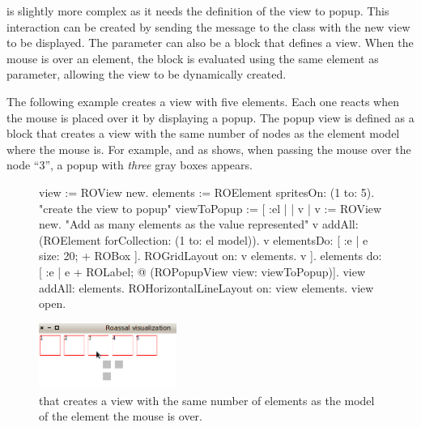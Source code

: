 \documentclass[a4paper,10pt,twoside]{book}
\begin{document}
 is slightly more complex as it needs the definition of the view to popup. This interaction can be created by sending the  message to the  class with the new view to be displayed. 
The parameter can also be a block that defines a view. When the mouse is over an element, the block is evaluated using the same element as parameter, allowing the view to be dynamically created.

The following example creates a view with five elements. Each one reacts when the mouse is placed over it by displaying a popup. The popup view is defined as a block that creates a view with the same number of nodes as the element model where the mouse is. For example, and as  shows, when passing the mouse over the node ``3'', a popup with \textit{three} gray boxes appears.

\begin{figure}[H]
      \begin{minipage}[t]{1\textwidth}
      \vspace{0pt}
     \begin{code}{}
view := ROView new.
elements := ROElement spritesOn: (1 to: 5).
"create the view to popup"
viewToPopup := [ :el | | v | 
	              	              v := ROView new.
	              	              "Add as many elements as the value represented"
	              	              v addAll: (ROElement forCollection: (1 to: el model)).
	              	              v elementsDo: [ :e | e size: 20; + ROBox ].
	              	              ROGridLayout on: v elements.
	              	              v ].
elements do: [ :e | e + ROLabel;  @ (ROPopupView view: viewToPopup)].
view addAll: elements.
ROHorizontalLineLayout on: view elements.
view open.
\end{code}
\end{minipage}\hfill\begin{minipage}[t]{1\textwidth}
	 \vspace{0pt} \raggedright
       \centering
		\includegraphics[width=0.4\textwidth]{popupView3}
   \end{minipage}
\label{fig:popupView}
\caption{ that creates a view with the same number of elements as the model of the element the mouse is over.}
\end{figure} 
\end{document}
